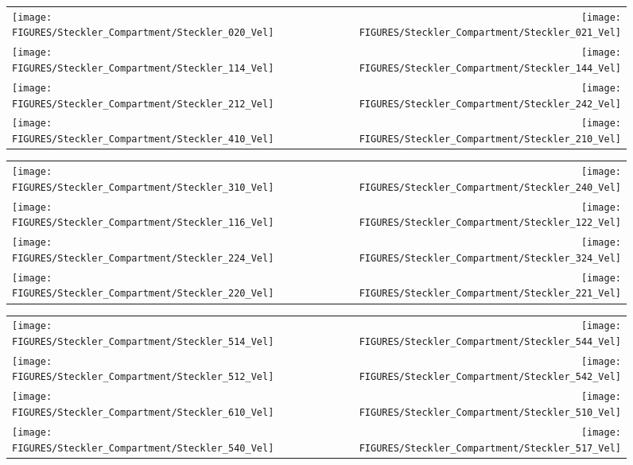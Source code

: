 \begin{figure}[p]
\begin{tabular*}{\textwidth}{l@{\extracolsep{\fill}}r}
\texttt{[image: FIGURES/Steckler\_Compartment/Steckler\_020\_Vel]} &
\texttt{[image: FIGURES/Steckler\_Compartment/Steckler\_021\_Vel]} \\
\texttt{[image: FIGURES/Steckler\_Compartment/Steckler\_114\_Vel]} &
\texttt{[image: FIGURES/Steckler\_Compartment/Steckler\_144\_Vel]} \\
\texttt{[image: FIGURES/Steckler\_Compartment/Steckler\_212\_Vel]} &
\texttt{[image: FIGURES/Steckler\_Compartment/Steckler\_242\_Vel]} \\
\texttt{[image: FIGURES/Steckler\_Compartment/Steckler\_410\_Vel]} &
\texttt{[image: FIGURES/Steckler\_Compartment/Steckler\_210\_Vel]}
\end{tabular*}
\label{Steckler_Vel_3}
\end{figure}

\begin{figure}[p]
\begin{tabular*}{\textwidth}{l@{\extracolsep{\fill}}r}
\texttt{[image: FIGURES/Steckler\_Compartment/Steckler\_310\_Vel]} &
\texttt{[image: FIGURES/Steckler\_Compartment/Steckler\_240\_Vel]} \\
\texttt{[image: FIGURES/Steckler\_Compartment/Steckler\_116\_Vel]} &
\texttt{[image: FIGURES/Steckler\_Compartment/Steckler\_122\_Vel]} \\
\texttt{[image: FIGURES/Steckler\_Compartment/Steckler\_224\_Vel]} &
\texttt{[image: FIGURES/Steckler\_Compartment/Steckler\_324\_Vel]} \\
\texttt{[image: FIGURES/Steckler\_Compartment/Steckler\_220\_Vel]} &
\texttt{[image: FIGURES/Steckler\_Compartment/Steckler\_221\_Vel]}
\end{tabular*}
\label{Steckler_Vel_4}
\end{figure}

\begin{figure}[p]
\begin{tabular*}{\textwidth}{l@{\extracolsep{\fill}}r}
\texttt{[image: FIGURES/Steckler\_Compartment/Steckler\_514\_Vel]} &
\texttt{[image: FIGURES/Steckler\_Compartment/Steckler\_544\_Vel]} \\
\texttt{[image: FIGURES/Steckler\_Compartment/Steckler\_512\_Vel]} &
\texttt{[image: FIGURES/Steckler\_Compartment/Steckler\_542\_Vel]} \\
\texttt{[image: FIGURES/Steckler\_Compartment/Steckler\_610\_Vel]} &
\texttt{[image: FIGURES/Steckler\_Compartment/Steckler\_510\_Vel]} \\
\texttt{[image: FIGURES/Steckler\_Compartment/Steckler\_540\_Vel]} &
\texttt{[image: FIGURES/Steckler\_Compartment/Steckler\_517\_Vel]}
\end{tabular*}
\label{Steckler_Vel_5}
\end{figure}

